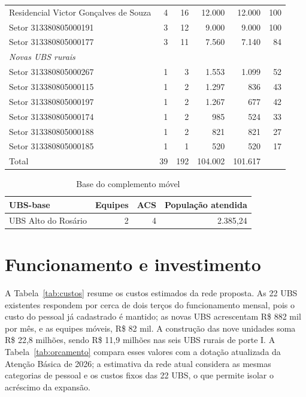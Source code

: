 \begin{longtable}{p{.42\linewidth}rrrrr}
Residencial Victor Gonçalves de Souza & 4 & 16 & 12.000 & 12.000 & 100\\
Setor 313380805000191 & 3 & 12 & 9.000 & 9.000 & 100\\
Setor 313380805000177 & 3 & 11 & 7.560 & 7.140 & 84\\
\midrule
\multicolumn{6}{l}{\textit{Novas UBS rurais}}\\
Setor 313380805000267 & 1 & 3 & 1.553 & 1.099 & 52\\
Setor 313380805000115 & 1 & 2 & 1.297 & 836 & 43\\
Setor 313380805000197 & 1 & 2 & 1.267 & 677 & 42\\
Setor 313380805000174 & 1 & 2 & 985 & 524 & 33\\
Setor 313380805000188 & 1 & 2 & 821 & 821 & 27\\
Setor 313380805000185 & 1 & 1 & 520 & 520 & 17\\
\midrule
Total & 39 & 192 & 104.002 & 101.617 & \\
\bottomrule\end{longtable}\endgroup
{}

\begin{table}[htbp]\centering
\caption{Base do complemento móvel}\label{tab:movel}
\begin{tabular}{lrrr}\toprule UBS-base & Equipes & ACS & População atendida\\\midrule
UBS Alto do Rosário & 2 & 4 & 2.385,24\\
\bottomrule\end{tabular}
\end{table}

\section{Funcionamento e investimento}

A Tabela~\ref{tab:custos} resume os custos estimados da rede proposta. As 22 UBS existentes respondem
por cerca de dois terços do funcionamento mensal, pois o custo do pessoal já cadastrado é mantido; as
novas UBS acrescentam R\$ 882 mil por mês, e as equipes móveis, R\$ 82 mil. A construção das nove
unidades soma R\$ 22,8 milhões, sendo R\$ 11,9 milhões nas seis UBS rurais de porte I. A Tabela~\ref{tab:orcamento} compara esses valores
com a dotação atualizada da Atenção Básica de 2026; a estimativa da rede atual considera as mesmas
categorias de pessoal e os custos fixos das 22 UBS, o que permite isolar o acréscimo da expansão.

